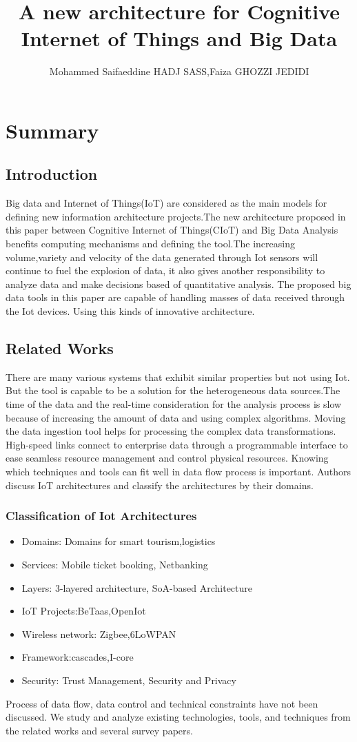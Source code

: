 \documentclass{article}
\title{A new architecture for Cognitive Internet of Things and Big Data}
\author{Mohammed Saifaeddine HADJ SASS,Faiza GHOZZI JEDIDI}
\begin{document}
\maketitle
\section{Summary}

\subsection{Introduction}
Big data and Internet of Things(IoT) are considered as the main models for defining new information architecture projects.The new architecture proposed in this paper between Cognitive Internet of Things(CIoT) and Big Data Analysis benefits computing mechanisms and defining the tool.The increasing volume,variety and velocity of the data generated through Iot sensors will continue to fuel the explosion of data, it also gives another responsibility to analyze data and make decisions based of quantitative analysis. The proposed big data tools in this paper are capable of handling masses of data received through the Iot devices. Using this kinds of innovative architecture.

\subsection{Related Works}
There are many various systems that exhibit similar properties but not using Iot. But the tool is capable to be a solution for the heterogeneous data sources.The time of the data and the real-time consideration for the analysis process is slow because of increasing the amount of data and using complex algorithms. Moving the data ingestion tool helps for processing the complex data transformations. High-speed links connect to enterprise data through a programmable interface to ease seamless resource management and control physical resources. Knowing which techniques and tools can fit well in data flow process is important. Authors discuss IoT architectures and classify the architectures by their domains.
\subsubsection{Classification of Iot Architectures}
\begin{itemize}
    \item{Domains: Domains for smart tourism,logistics}
    \item{Services: Mobile ticket booking, Netbanking}
    \item{Layers: 3-layered architecture, SoA-based Architecture}
    \item{IoT Projects:BeTaas,OpenIot}
    \item{Wireless network: Zigbee,6LoWPAN}
    \item{Framework:cascades,I-core}
    \item{Security: Trust Management, Security and Privacy}
\end{itemize}
Process of data flow, data control and technical constraints have not been discussed. We study and analyze existing technologies, tools, and techniques from the related works and several survey papers.
\end{document}
